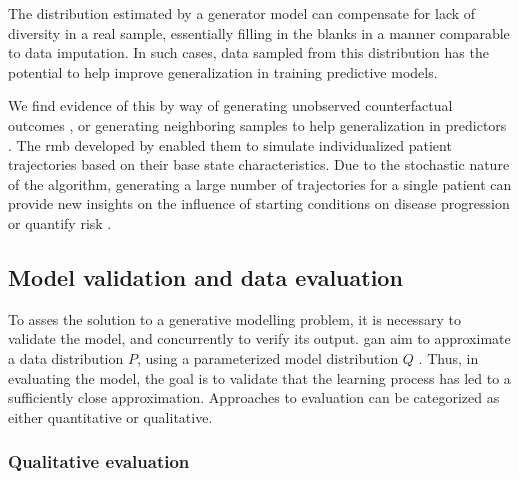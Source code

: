         The distribution estimated by a generator model can compensate for lack of diversity in a real sample, essentially filling in the blanks in a manner comparable to data imputation. In such cases, data sampled from this distribution has the potential to help improve generalization in training predictive models.\par 
        
        We find evidence of this by way of generating unobserved counterfactual outcomes \cite{yoon2018imputation}, or generating neighboring samples to help generalization in predictors \cite{Che_2017}. The \gls{rmb} developed by \citeauthor{Fisher2019} enabled them to simulate individualized patient trajectories based on their base state characteristics. Due to the stochastic nature of the algorithm, generating a large number of trajectories for a single patient can provide new insights on the influence of starting conditions on disease progression or quantify risk \cite{Fisher2019}.
        
    \subsection{Model validation and data evaluation}

        To asses the solution to a generative modelling problem, it is necessary to validate the model, and concurrently to verify its output. \gls{gan} aim to approximate a data distribution $P$, using a parameterized model distribution $Q$ \cite{Borji2018-fy}. Thus, in evaluating the model, the goal is to validate that the learning process has led to a sufficiently close approximation. Approaches to evaluation can be categorized as either quantitative or qualitative.

        \subsubsection{Qualitative evaluation}


